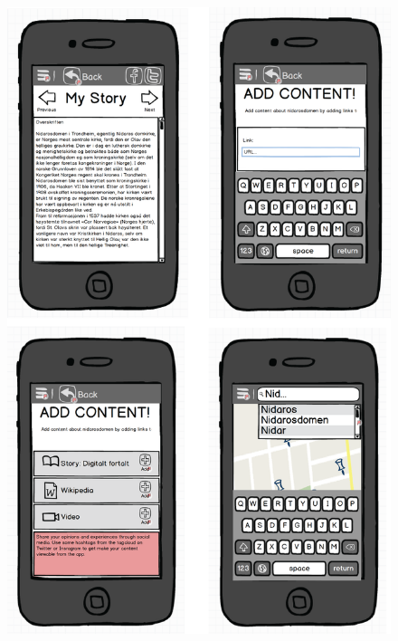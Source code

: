 \documentclass[12pt,a4paper,titlepage]{article}
\begin{document}
\begin{appendices}
\begin{figure}[!h]
\centering
\includegraphics[width=0.9 \textwidth] {res/mockup2.png}
\end{figure}


\end{appendices}
\end{document}
